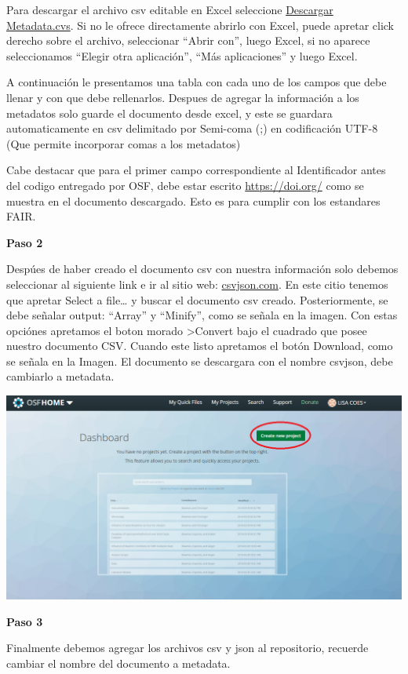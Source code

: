 \documentclass[
  14pt,
]{book}
\begin{document}
Para descargar el archivo csv editable en Excel seleccione \href{https://raw.githubusercontent.com/franciscomeneses/CADIS/master/metadata.csv}{Descargar Metadata.cvs}. Si no le ofrece directamente abrirlo con Excel, puede apretar click derecho sobre el archivo, seleccionar ``Abrir con'', luego Excel, si no aparece seleccionamos ``Elegir otra aplicación'', ``Más aplicaciones'' y luego Excel.

A continuación le presentamos una tabla con cada uno de los campos que debe llenar y con que debe rellenarlos. Despues de agregar la información a los metadatos solo guarde el documento desde excel, y este se guardara automaticamente en csv delimitado por Semi-coma (;) en codificación UTF-8 (Que permite incorporar comas a los metadatos)

Cabe destacar que para el primer campo correspondiente al Identificador antes del codigo entregado por OSF, debe estar escrito \url{https://doi.org/} como se muestra en el documento descargado. Esto es para cumplir con los estandares FAIR.

\textbf{Paso 2}

Despúes de haber creado el documento csv con nuestra información solo debemos seleccionar al siguiente link e ir al sitio web: \href{https://csvjson.com/csv2json}{csvjson.com}. En este citio tenemos que apretar Select a file\ldots{} y buscar el documento csv creado. Posteriormente, se debe señalar output: ``Array'' y ``Minify'', como se señala en la imagen. Con estas opciónes apretamos el boton morado \textgreater Convert bajo el cuadrado que posee nuestro documento CSV. Cuando este listo apretamos el botón Download, como se señala en la Imagen. El documento se descargara con el nombre csvjson, debe cambiarlo a metadata.

\begin{center}\includegraphics[width=0.5\linewidth,]{images/crearrepo} \end{center}

\textbf{Paso 3}

Finalmente debemos agregar los archivos csv y json al repositorio, recuerde cambiar el nombre del documento a metadata.
\end{document}
